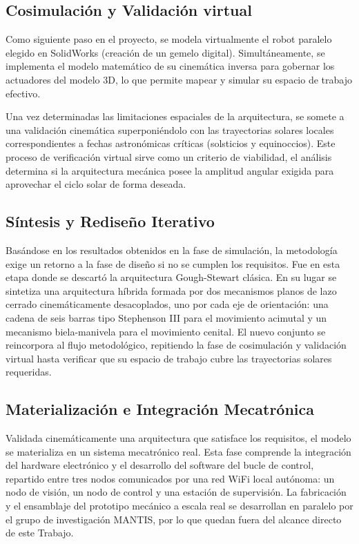 \subsection{Cosimulación y Validación virtual}
Como siguiente paso en el proyecto, se modela virtualmente el robot paralelo elegido en SolidWorks (creación de un gemelo digital). Simultáneamente, se implementa el modelo matemático de su cinemática inversa para gobernar los actuadores del modelo 3D, lo que permite mapear y simular su espacio de trabajo efectivo.

Una vez determinadas las limitaciones espaciales de la arquitectura, se somete a una validación cinemática superponiéndolo con las trayectorias solares locales correspondientes a fechas astronómicas críticas (solsticios y equinoccios). Este proceso de verificación virtual sirve como un criterio de viabilidad, el análisis determina si la arquitectura mecánica posee la amplitud angular exigida para aprovechar el ciclo solar de forma deseada.

\subsection{Síntesis y Rediseño Iterativo}
Basándose en los resultados obtenidos en la fase de simulación, la metodología exige un retorno a la fase de diseño si no se cumplen los requisitos. Fue en esta etapa donde se descartó la arquitectura Gough-Stewart clásica. En su lugar se sintetiza una arquitectura híbrida formada por dos mecanismos planos de lazo cerrado cinemáticamente desacoplados, uno por cada eje de orientación: una cadena de seis barras tipo Stephenson III para el movimiento acimutal y un mecanismo biela-manivela para el movimiento cenital. El nuevo conjunto se reincorpora al flujo metodológico, repitiendo la fase de cosimulación y validación virtual hasta verificar que su espacio de trabajo cubre las trayectorias solares requeridas.

\subsection{Materialización e Integración Mecatrónica}
Validada cinemáticamente una arquitectura que satisface los requisitos, el modelo se materializa en un sistema mecatrónico real. Esta fase comprende la integración del hardware electrónico y el desarrollo del software del bucle de control, repartido entre tres nodos comunicados por una red WiFi local autónoma: un nodo de visión, un nodo de control y una estación de supervisión. La fabricación y el ensamblaje del prototipo mecánico a escala real se desarrollan en paralelo por el grupo de investigación MANTIS, por lo que quedan fuera del alcance directo de este Trabajo.

